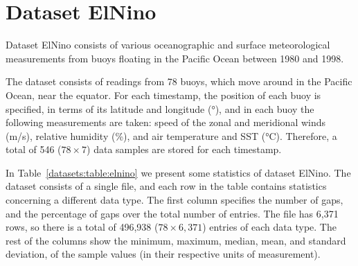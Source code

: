 
\clearpage
\section{Dataset ElNino}
\label{datasets:elnino}

Dataset ElNino \cite{dataset:elnino} consists of various oceanographic and surface meteorological measurements from buoys floating in the Pacific Ocean between 1980 and 1998. \TAODef


The dataset consists of readings from 78 buoys, which move around in the Pacific Ocean, near the equator. For each timestamp, the position of each buoy is specified, in terms of its latitude and longitude (°), and in each buoy the following measurements are taken: speed of the zonal and meridional winds (m/s), relative humidity (\%), and air temperature and SST (°C). Therefore, a total of 546 ($78\times7$) data samples are stored for each timestamp.


In Table~\ref{datasets:table:elnino} we present some statistics of dataset ElNino. The dataset consists of a single file, and each row in the table contains statistics concerning a different data type. The first column specifies the number of gaps, and the percentage of gaps over the total number of entries. The file has 6,371 rows, so there is a total of 496,938 ($78\times6,371$) entries of each data type. The rest of the columns show the minimum, maximum, median, mean, and standard deviation, of the sample values (in their respective units of measurement).




